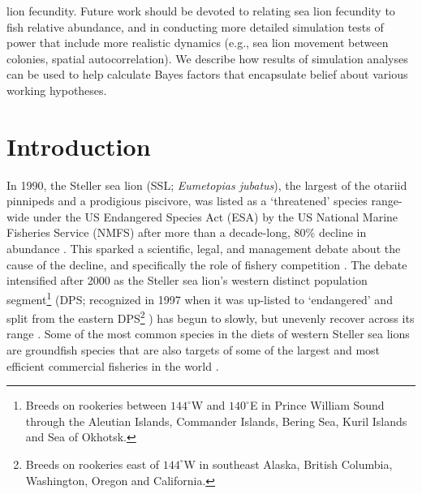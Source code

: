 \documentclass[11pt]{article}
\begin{document}
lion fecundity. Future work should be devoted to relating sea lion fecundity to fish relative abundance, and in conducting more detailed simulation tests of power that include more realistic dynamics (e.g., sea lion movement between colonies, spatial autocorrelation).  We describe how results of simulation analyses can be used to help calculate Bayes factors that encapsulate belief about various working hypotheses.




\clearpage

\renewcommand{\baselinestretch}{1.8}\normalsize


\section{Introduction}

In 1990, the Steller sea lion (SSL; {\it Eumetopias jubatus}), the largest of the otariid pinnipeds and a prodigious piscivore, was listed as a `threatened' species range-wide under the US Endangered Species Act (ESA) by the US National Marine Fisheries Service (NMFS) after more than a decade-long, 80\% decline in abundance \citep{CalkinsPitcher1982,LoughlinEtAl1992,NMFS1992}.  This sparked a scientific, legal, and management debate about the cause of the decline, and specifically the role of fishery competition \citep{Alverson1992,NMFS1992,FritzEtAl1995,RosenTrites2000,McBeath2004}.  The debate intensified after 2000 as the Steller sea lion's western distinct population segment\footnote[1]{Breeds on rookeries between $144^\circ$W and $140^\circ$E in Prince William Sound through the Aleutian Islands, Commander Islands, Bering Sea, Kuril Islands and Sea of Okhotsk.}  (DPS; recognized in 1997 when it was up-listed to  `endangered' and split from the eastern DPS\footnote[2]{Breeds on rookeries east of $144^\circ$W in southeast Alaska, British Columbia, Washington, Oregon and California.} ) has begun to slowly, but unevenly recover across its range \citep{Loughlin1997,JohnsonFritzInReview, NMFS2013}.  Some of the most common species in the diets of western Steller sea lions are groundfish species \citep[e.g., walleye pollock {\it Theragra chalcogramma}, Pacific cod {\it Gadus macrocephalus}, and Atka mackerel {\it Pleurogrammus monopterygius};][]{ SinclairZeppelin2002,TollitEtAl2004,ZeppelinEtAl2004,McKenzieWynne2008,WaiteEtAl2012} that are also targets of some of the largest and most efficient commercial fisheries in the world \citep{FissellEtAl2013}.
\end{document}
